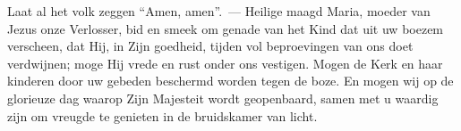\documentclass[12pt,twoside,a5paper]{article}
\begin{document}
\begin{halfparskip}
    Laat al het volk zeggen ``Amen, amen''.~--- Heilige maagd Maria, moeder van Jezus onze Verlosser, bid en smeek om genade van het Kind dat uit uw boezem verscheen, dat Hij, in Zijn goedheid, tijden vol beproevingen van ons doet verdwijnen; moge Hij vrede en rust onder ons vestigen. Mogen de Kerk en haar kinderen door uw gebeden beschermd worden tegen de boze. En mogen wij op de glorieuze dag waarop Zijn Majesteit wordt geopenbaard, samen met u waardig zijn om vreugde te genieten in de bruidskamer van licht.
\end{halfparskip}

\begin{halfparskip}
  \liturgicalOption{}
\end{halfparskip}



\end{document}

